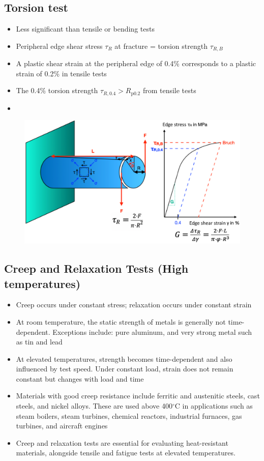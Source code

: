 \documentclass{article}
\begin{document}
\subsection{Torsion test}
\begin{itemize}
  \item Less significant than tensile or bending tests
  \item Peripheral edge shear stress $\tau_R$ at fracture = torsion strength $\tau_{R, B}$
  \item A plastic shear strain at the peripheral edge of 0.4\% corresponds to a plastic strain of 0.2\% in tensile tests
  \item The 0.4\% torsion strength $\tau_{R,0.4} > R_\text{p0.2}$ from tensile tests 
  \item {}
\end{itemize}

\begin{figure}[ht!]
  \centering
  \includegraphics[width=.7\textwidth]{media/torsion-test.png}
\end{figure}

\newpage
\subsection{Creep and Relaxation Tests (High temperatures)}
\begin{itemize}
  \item Creep occurs under constant stress; relaxation occurs under constant strain
  \item At room temperature, the static strength of metals is generally not time-dependent.
    Exceptions include: pure aluminum, and very strong metal such as tin and lead
  \item At elevated temperatures, strength becomes time-dependent and also influenced by test speed.
    Under constant load, strain does not remain constant but changes with load and time
  \item Materials with good creep resistance include ferritic and austenitic steels, cast steels, and nickel alloys.
    These are used above 400$^\circ$C in applications such as steam boilers, steam turbines, chemical reactors, industrial furnaces, gas turbines, and aircraft engines
  \item Creep and relaxation tests are essential for evaluating heat-resistant materials,
    alongside tensile and fatigue tests at elevated temperatures. 
\end{itemize}
\end{document}
